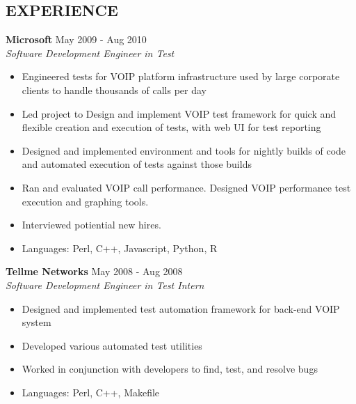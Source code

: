 \documentclass[line,margin]{res}
\begin{document}

      \address{anorwell@gmail.com 647-987-3081 \\
      github.com/ANorwell \\
      Toronto, ON }
    
 
\begin{resume}

\section{EXPERIENCE}

    {\bf Microsoft} \hfill May 2009 - Aug 2010 \\
    {\sl Software Development Engineer in Test}
                 \begin{itemize}  \itemsep -2pt %
                 \item Engineered tests for VOIP platform infrastructure used by large corporate clients to handle thousands of calls per day\item Led project to Design and implement VOIP test framework for quick and flexible creation and execution of tests, with web UI for test reporting\item Designed and implemented environment and tools for nightly builds of code and automated execution of tests against those builds\item Ran and evaluated VOIP call performance. Designed VOIP performance test execution and graphing tools.\item Interviewed potiential new hires.\item Languages: Perl, C++, Javascript, Python, R
                \end{itemize}
  
    {\bf Tellme Networks} \hfill May 2008 - Aug 2008 \\
    {\sl Software Development Engineer in Test Intern}
                 \begin{itemize}  \itemsep -2pt %
                 \item Designed and implemented test automation framework for back-end VOIP system\item Developed various automated test utilities\item Worked in conjunction with developers to find, test, and resolve bugs\item Languages: Perl, C++, Makefile
                \end{itemize}
  

\end{resume}
\end{document}

